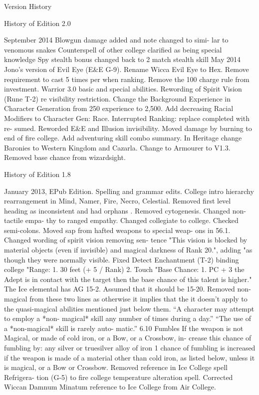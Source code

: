 \begin{Chapter}{Version History}

History of Edition 2.0 

September 2014 
Blowgun damage added and note changed to simi-
lar to venomous snakes 
Counterspell  of  other  college  clarified  as  being 
special knowledge 
Spy  stealth  bonus  changed  back  to  2%
match stealth skill 
May 2014 
Jono's version of Evil Eye (E\&E G-9). 
Rename Wicca Evil Eye to Hex. 
Remove  requirement  to  cast  5  times  per  when 
ranking. 
Remove the 100 charge rule from investment. 
Warrior 3.0 basic and special abilities. 
Rewording of Spirit Vision (Rune T-2) re visibility 
restriction. 
Change  the  Background  Experience  in  Character 
Generation from 250 experience to 2,500. 
Add decreasing Racial Modifiers to Character Gen: 
Race. 
Interrupted  Ranking:  replace  completed  with  re-
sumed. 
Reworded E\&E and Illusion invisibility. 
Moved damage by burning to end of fire college. 
Add adventuring skill combo summary. 
In  Heritage  change  Baronies  to  Western  Kingdom 
and Cazarla. 
Change to Armourer  to V1.3. 
Removed base chance from wizardsight. 

History of Edition 1.8 

January 2013, EPub Edition. Spelling and grammar 
edits.  College  intro  hierarchy  rearrangement  in 
Mind, Namer, Fire, Necro, Celestial. Removed first 
level  heading  as  inconsistent  and  had  orphans  . 
Removed  cytogenesis.  Changed  non-tactile  empa-
thy  to  ranged  empathy.  Changed  collegiate  to 
college. Checked semi-colons.  
Moved  sap  from  hafted  weapons  to  special  weap-
ons in 56.1. 
Changed  wording  of  spirit  vision  removing  sen-
tence  "This  vision  is  blocked  by  material  objects 
(even  if  invisible)  and  magical  darkness  of  Rank 
20.", adding "as though they were normally visible.  
Fixed  Detect  Enchantment  (T-2)  binding  college 
"Range:  1.  30  feet  (+  5  /  Rank)  2.  Touch  "Base 
Chance: 1. PC + 3%
the Adept is in contact with the target then the base 
chance of this talent is higher." 
The  Ice  elemental  has  AG  15-2.  Assumed  that  it 
should be 15-20. 
Removed  non-magical  from  these  two  lines  as 
otherwise it implies that the it doesn't apply to the 
quasi-magical abilities mentioned just below them. 
“A  character  may  attempt  to  employ  a  *non-
magical* skill any number of times during a day.” 
“The  use  of  a  *non-magical*  skill  is  rarely  auto-
matic.”  
6.10  Fumbles  If  the  weapon  is  not  Magical,  or 
made  of  cold  iron,  or  a  Bow,  or  a  Crossbow,  in-
crease  this  chance  of  fumbling  by:  any  silver  or 
truesilver  alloy  of  iron  1%
chance  of  fumbling  is  increased  if  the  weapon  is 
made  of  a  material  other  than  cold  iron,  as  listed 
below, unless it is magical, or a Bow or Crossbow.  
Removed reference in  Ice College spell Refrigera-
tion  (G-5)  to  fire  college  temperature  alteration 
spell.  
Corrected  Wiccan  Damnum Minatum  reference  to 
Ice College from Air College. 


\end{Chapter}
